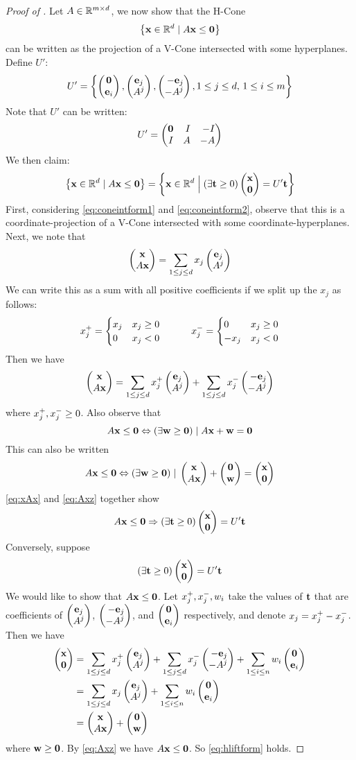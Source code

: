 \begin{proof}[Proof of {\Hlift}]
	Let $A \in \mathbb{R}^{{m}\times d}$, we now show that the H-Cone
	\[\left\{\mathbf{x} \in \mathbb{R}^d \;|\; A\mathbf{x} \leq \mathbf{0}\right\}\]
	can be written as the projection of a V-Cone intersected with some hyperplanes.  Define $U'$:
	\[ U' = \set{\zei, \eAj, \neAj, 1 \leq j \leq d,\, 1 \leq i \leq m} \]
	Note that $U'$ can be written:
	\begin{equation}\label{eq:Ulift}
		U' = \begin{pmatrix*}[r] \0 & I & -I \\ I & A & -A \end{pmatrix*}
	\end{equation}
	We then claim:
	\begin{equation}\label{eq:hliftform}
		\set{\xv \st A\x \leq \0} = \set{\xv \St (\exists \t \geq 0) \xz = U'\t}
	\end{equation}
	First, considering \eqref{eq:coneintform1} and \eqref{eq:coneintform2}, observe that this is a coordinate-projection of a V-Cone intersected with some coordinate-hyperplanes.
	Next, we note that
	\[ \xAx = \jsum x_j \eAj \]
	We can write this as a sum with all positive coefficients if we split up the $x_j$ as follows:
	\[
		x_j^+ = \begin{cases} x_j & x_j \geq 0 \\ 0 & x_j < 0 \end{cases} \quad\quad\quad
		x_j^- = \begin{cases} 0 & x_j \geq 0 \\ -x_j & x_j < 0 \end{cases}
	\]
	Then we have
	\begin{equation} \label{eq:xAx}
		\xAx = \jsum \xjp \eAj + \jsum \xjm \neAj
	\end{equation}
	where $x_j^+, x_j^- \geq 0$.  Also observe that
	\[ A\mathbf{x} \leq \mathbf{0} \Leftrightarrow (\exists \mathbf{w} \geq \mathbf{0}) \;|\; A\mathbf{x} + \mathbf{w} = \mathbf{0} \]
	This can also be written
	\begin{equation} \label{eq:Axz}
		A\x \leq \0 \Leftrightarrow (\exists \w \geq \0) \st \xAx + \zw = \xz
	\end{equation}
	\eqref{eq:xAx} and \eqref{eq:Axz} together show
	\[ A\x \leq \0 \Rightarrow (\exists \t \geq 0) \xz = U'\t \]
	Conversely, suppose
	\[ (\exists \t \geq 0) \xz = U'\t \]
	We would like to show that $A\mathbf{x} \leq \mathbf{0}$.  Let $x_j^+,x_j^-,w_i$ take the values of $\mathbf{t}$ that are coefficients of $\eAj$, $\neAj$, and $\zei$ respectively, and denote $x_j = x_j^+ - x_j^-$.  Then we have
	\begin{align*}
		\xz & = \jsum \xjp \eAj + \jsum \xjm \neAj + \isum w_i\zei \\
		    & = \jsum x_j \eAj + \isum w_i\zei                     \\
		    & = \xAx + \zw
	\end{align*}
	where $\mathbf{w} \geq \mathbf{0}$.  By \eqref{eq:Axz} we have $A\mathbf{x} \leq \mathbf{0}$.  So \eqref{eq:hliftform} holds.
\end{proof}

